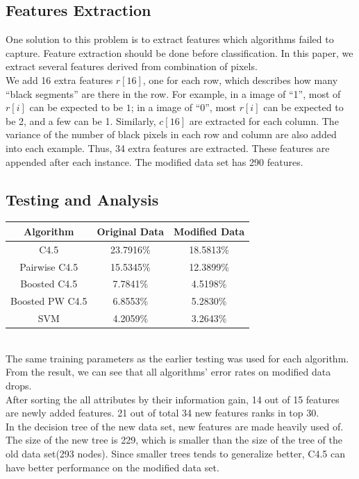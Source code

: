 \documentclass[a4paper,11pt]{article}
\begin{document}
\subsection{Features Extraction}
One solution to this problem is to extract features which algorithms failed to capture. Feature extraction should be done before classification. In this paper, we extract several features derived from combination of pixels.\\
We add 16 extra features $r[16]$, one for each row, which describes how many ``black segments'' are there in the row. For example, in a image of ``1'', most of $r[i]$ can be expected to be $1$; in a image of ``0'', most $r[i]$ can be expected to be 2, and a few can be 1. Similarly, $c[16]$ are extracted for each column. The variance of the number of black pixels in each row and column are also added into each example. Thus, 34 extra features are extracted. These features are appended after each instance. The modified data set has 290 features.\\
\subsection{Testing and Analysis}
\vspace{0.5cm}
\begin{tabular}{c c c}
Algorithm		&	Original Data	&Modified Data\\
\hline \hline
C4.5                            &23.7916\%		& 18.5813\%\\
Pairwise C4.5                   &15.5345\%      & 12.3899\%\\
Boosted C4.5	                &7.7841\%		& 4.5198\%\\
Boosted PW C4.5	                &6.8553\%       & 5.2830\%\\
SVM                         	&4.2059\%       & 3.2643\%\\
\end{tabular}
\vspace{0.5cm}\\
The same training parameters as the earlier testing was used for each algorithm. From the result, we can see that all algorithms' error rates on modified data drops.\\
After sorting the all attributes by their information gain, 14 out of 15 features are newly added features. 21 out of total 34 new features ranks in top 30.\\
In the decision tree of the new data set, new features are made heavily used of. The size of the new tree is 229, which is smaller than the size of the tree of the old data set(293 nodes). Since smaller trees tends to generalize better, C4.5 can have better performance on the modified data set.\\
\end{document}

